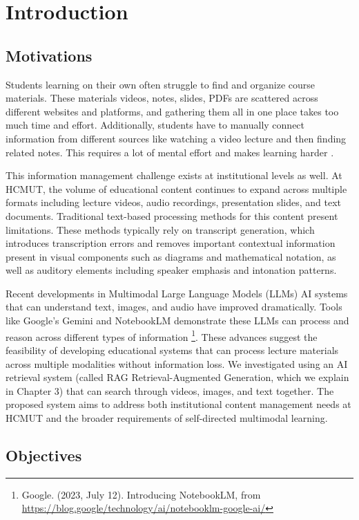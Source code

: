 \chapter{Introduction}

\section{Motivations}

Students learning on their own often struggle to find and organize course materials. These materials videos, notes, slides, PDFs are scattered across different websites and platforms, and gathering them all in one place takes too much time and effort. Additionally, students have to manually connect information from different sources like watching a video lecture and then finding related notes. This requires a lot of mental effort and makes learning harder \cite{bib01, bib02}.

This information management challenge exists at institutional levels as well. At HCMUT, the volume of educational content continues to expand across multiple formats including lecture videos, audio recordings, presentation slides, and text documents. Traditional text-based processing methods for this content present limitations. These methods typically rely on transcript generation, which introduces transcription errors and removes important contextual information present in visual components such as diagrams and mathematical notation, as well as auditory elements including speaker emphasis and intonation patterns.

Recent developments in Multimodal Large Language Models (LLMs) AI systems that can understand text, images, and audio have improved dramatically. Tools like Google's Gemini and NotebookLM demonstrate these LLMs can process and reason across different types of information \footnote{Google. (2023, July 12). Introducing NotebookLM, from \url{https://blog.google/technology/ai/notebooklm-google-ai/}}. These advances suggest the feasibility of developing educational systems that can process lecture materials across multiple modalities without information loss. We investigated using an AI retrieval system (called RAG Retrieval-Augmented Generation, which we explain in Chapter 3) that can search through videos, images, and text together. The proposed system aims to address both institutional content management needs at HCMUT and the broader requirements of self-directed multimodal learning.\section{Objectives}

